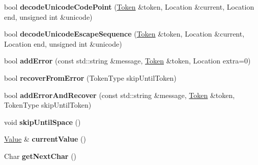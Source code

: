 \begin{DoxyCompactItemize}
\item 
\hypertarget{class_json_1_1_reader_a8fe24db3e9953aef3d637a56447e795c}{}bool {\bfseries decode\+Unicode\+Code\+Point} (\hyperlink{class_json_1_1_reader_1_1_token}{Token} \&token, Location \&current, Location end, unsigned int \&unicode)\label{class_json_1_1_reader_a8fe24db3e9953aef3d637a56447e795c}

\item 
\hypertarget{class_json_1_1_reader_a469cb6f55971d7c41fca2752a3aa5bf7}{}bool {\bfseries decode\+Unicode\+Escape\+Sequence} (\hyperlink{class_json_1_1_reader_1_1_token}{Token} \&token, Location \&current, Location end, unsigned int \&unicode)\label{class_json_1_1_reader_a469cb6f55971d7c41fca2752a3aa5bf7}

\item 
\hypertarget{class_json_1_1_reader_a04a3a13dbc609dfdf9e3c6723e37ff21}{}bool {\bfseries add\+Error} (const std\+::string \&message, \hyperlink{class_json_1_1_reader_1_1_token}{Token} \&token, Location extra=0)\label{class_json_1_1_reader_a04a3a13dbc609dfdf9e3c6723e37ff21}

\item 
\hypertarget{class_json_1_1_reader_a8d4ed03a43082c5ace81ba5b81425eaf}{}bool {\bfseries recover\+From\+Error} (Token\+Type skip\+Until\+Token)\label{class_json_1_1_reader_a8d4ed03a43082c5ace81ba5b81425eaf}

\item 
\hypertarget{class_json_1_1_reader_af47fb7564db6ac21faebaba8cebb41ce}{}bool {\bfseries add\+Error\+And\+Recover} (const std\+::string \&message, \hyperlink{class_json_1_1_reader_1_1_token}{Token} \&token, Token\+Type skip\+Until\+Token)\label{class_json_1_1_reader_af47fb7564db6ac21faebaba8cebb41ce}

\item 
\hypertarget{class_json_1_1_reader_ad922ea5a8ab333084edbb84827861fa3}{}void {\bfseries skip\+Until\+Space} ()\label{class_json_1_1_reader_ad922ea5a8ab333084edbb84827861fa3}

\item 
\hypertarget{class_json_1_1_reader_a85597f763fb0148a17359b6dfc6f7326}{}\hyperlink{class_json_1_1_value}{Value} \& {\bfseries current\+Value} ()\label{class_json_1_1_reader_a85597f763fb0148a17359b6dfc6f7326}

\item 
\hypertarget{class_json_1_1_reader_ab61eb61333cc9ec3afe785663a53ce90}{}Char {\bfseries get\+Next\+Char} ()\label{class_json_1_1_reader_ab61eb61333cc9ec3afe785663a53ce90}


\end{DoxyCompactItemize}
